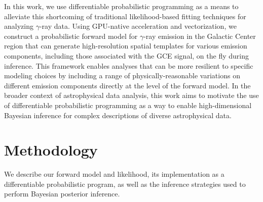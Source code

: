 \documentclass{article}
\theoremstyle{plain}
\theoremstyle{definition}
\theoremstyle{remark}
\newcommand{\Fermi} {\emph{Fermi}\xspace}
\begin{document}
In this work, we use differentiable probabilistic programming as a means to alleviate this shortcoming of traditional likelihood-based fitting techniques for analyzing $\gamma$-ray data. Using GPU-native acceleration and vectorization, we construct a probabilistic forward model for $\gamma$-ray emission in the Galactic Center region that can generate high-resolution spatial templates for various emission components, including those associated with the GCE signal, on the fly during inference. This framework enables analyses that can be more resilient to specific modeling choices by including a range of physically-reasonable variations on different emission components directly at the level of the forward model. In the broader context of astrophysical data analysis, this work aims to motivate the use of differentiable probabilistic programming as a way to enable high-dimensional Bayesian inference for complex descriptions of diverse astrophysical data.


\vspace{0.05in}    

\section {Methodology} 

We describe our forward model and likelihood, its implementation as a differentiable probabilistic program, as well as the inference strategies used to perform Bayesian posterior inference.
\end{document}
